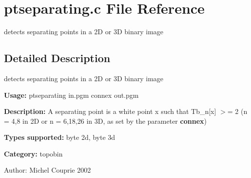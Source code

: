 \section{ptseparating.c File Reference}
\label{ptseparating_8c}
detects separating points in a 2D or 3D binary image  




\label{_details}
\subsection{Detailed Description}
detects separating points in a 2D or 3D binary image 

{\bf Usage:} ptseparating in.pgm connex out.pgm

{\bf Description:} A separating point is a white point x such that Tb\_\-n[x] $>$= 2 (n = 4,8 in 2D or n = 6,18,26 in 3D, as set by the parameter {\bf connex})

{\bf Types supported:} byte 2d, byte 3d

{\bf Category:} topobin

\begin{Desc}
\item[Author:]Michel Couprie 2002 \end{Desc}
